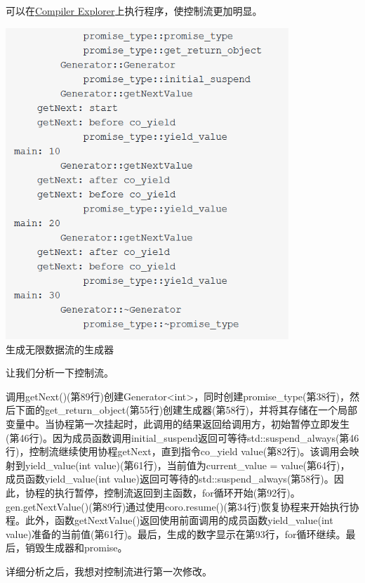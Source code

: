 可以在\href{https://godbolt.org/z/cTW9Gq}{Compiler Explorer}上执行程序，使控制流更加明显。

\begin{center}
\includegraphics[width=0.8\textwidth]{content/3/chapter7/images/14.png}\\
生成无限数据流的生成器
\end{center}

让我们分析一下控制流。

调用getNext()(第89行)创建Generator<int>，同时创建promise\_type(第38行)，然后下面的get\_return\_object(第55行)创建生成器(第58行)，并将其存储在一个局部变量中。当协程第一次挂起时，此调用的结果返回给调用方，初始暂停立即发生(第46行)。因为成员函数调用initial\_suspend返回可等待std::suspend\_always(第46行)，控制流继续使用协程getNext，直到指令co\_yield value(第82行)。该调用会映射到yield\_value(int value)(第61行)，当前值为current\_value = value(第64行)，成员函数yield\_value(int value)返回可等待的std::suspend\_always(第58行)。因此，协程的执行暂停，控制流返回到主函数，for循环开始(第92行)。gen.getNextValue()(第89行)通过使用coro.resume()(第34行)恢复协程来开始执行协程。此外，函数getNextValue()返回使用前面调用的成员函数yield\_value(int value)准备的当前值(第61行)。最后，生成的数字显示在第93行，for循环继续。最后，销毁生成器和promise。

详细分析之后，我想对控制流进行第一次修改。


